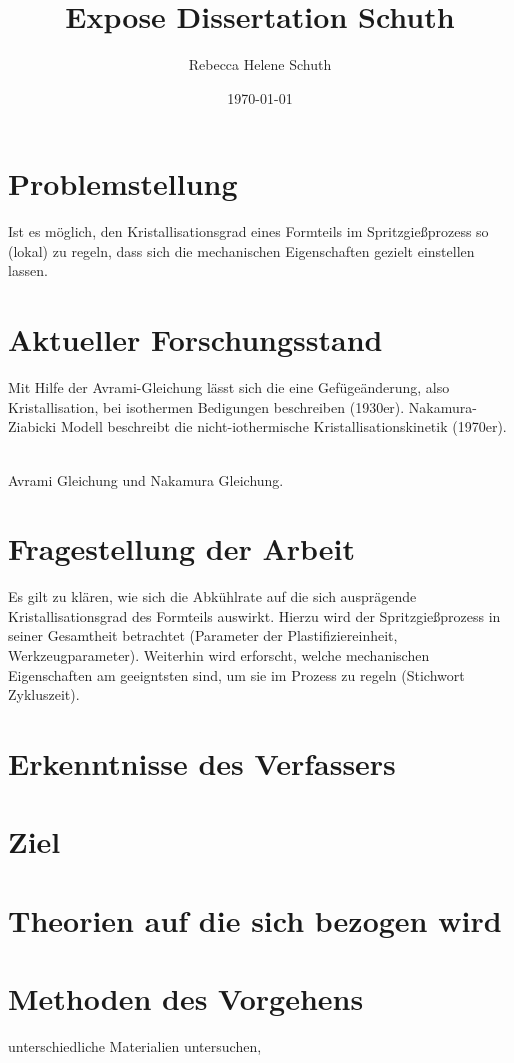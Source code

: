 \documentclass{expose} %
\title{Expose Dissertation Schuth}
\author{Rebecca Helene Schuth}
\date{\today}
\begin{document}
\maketitle


\section{Problemstellung}
Ist es möglich, den Kristallisationsgrad eines Formteils im Spritzgießprozess so (lokal) zu regeln, dass sich die mechanischen Eigenschaften gezielt einstellen lassen. 

\section{Aktueller Forschungsstand}
Mit Hilfe der Avrami-Gleichung lässt sich die eine Gefügeänderung, also Kristallisation, bei isothermen Bedigungen beschreiben (1930er).
Nakamura-Ziabicki Modell beschreibt die nicht-iothermische Kristallisationskinetik (1970er).  

\\
Avrami Gleichung und Nakamura Gleichung.  
\\

\section{Fragestellung der Arbeit}
Es gilt zu klären, wie sich die Abkühlrate auf die sich ausprägende Kristallisationsgrad des Formteils auswirkt. 
Hierzu wird der Spritzgießprozess in seiner Gesamtheit betrachtet (Parameter der Plastifiziereinheit, Werkzeugparameter).
Weiterhin wird erforscht, welche mechanischen Eigenschaften am geeigntsten sind, um sie im Prozess zu regeln (Stichwort Zykluszeit).


\section{Erkenntnisse des Verfassers}
\section{Ziel}
\section{Theorien auf die sich bezogen wird}
\section{Methoden des Vorgehens}
unterschiedliche Materialien untersuchen,  
\end{document}
